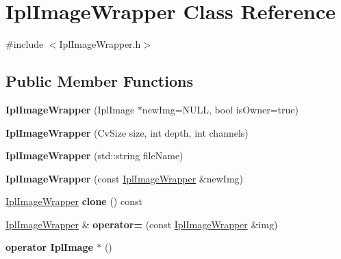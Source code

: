 \hypertarget{class_ipl_image_wrapper}{
\section{IplImageWrapper Class Reference}
\label{class_ipl_image_wrapper}
}


{\ttfamily \#include $<$IplImageWrapper.h$>$}

\subsection*{Public Member Functions}
\begin{DoxyCompactItemize}
\item 
\hypertarget{class_ipl_image_wrapper_a7516a4fcd5b663df2b8549b7b8f5c578}{
{\bfseries IplImageWrapper} (IplImage $\ast$newImg=NULL, bool isOwner=true)}
\label{class_ipl_image_wrapper_a7516a4fcd5b663df2b8549b7b8f5c578}

\item 
\hypertarget{class_ipl_image_wrapper_a2216b0bfc63dbe956a57fc4702ebf271}{
{\bfseries IplImageWrapper} (CvSize size, int depth, int channels)}
\label{class_ipl_image_wrapper_a2216b0bfc63dbe956a57fc4702ebf271}

\item 
\hypertarget{class_ipl_image_wrapper_a0eba79af9d74dd81877615d882ef1899}{
{\bfseries IplImageWrapper} (std::string fileName)}
\label{class_ipl_image_wrapper_a0eba79af9d74dd81877615d882ef1899}

\item 
\hypertarget{class_ipl_image_wrapper_a15058194f8584af51f2d3fb74ddf9797}{
{\bfseries IplImageWrapper} (const \hyperlink{class_ipl_image_wrapper}{IplImageWrapper} \&newImg)}
\label{class_ipl_image_wrapper_a15058194f8584af51f2d3fb74ddf9797}

\item 
\hypertarget{class_ipl_image_wrapper_aad2804ccc119c57efc5e445cdc40925f}{
\hyperlink{class_ipl_image_wrapper}{IplImageWrapper} {\bfseries clone} () const }
\label{class_ipl_image_wrapper_aad2804ccc119c57efc5e445cdc40925f}

\item 
\hypertarget{class_ipl_image_wrapper_a1bd6b4257f787448f6a03cf6619e8320}{
\hyperlink{class_ipl_image_wrapper}{IplImageWrapper} \& {\bfseries operator=} (const \hyperlink{class_ipl_image_wrapper}{IplImageWrapper} \&img)}
\label{class_ipl_image_wrapper_a1bd6b4257f787448f6a03cf6619e8320}

\item 
\hypertarget{class_ipl_image_wrapper_a6a4e72dcabb66c3577ce4c07ea1b7246}{
{\bfseries operator IplImage $\ast$} ()}
\label{class_ipl_image_wrapper_a6a4e72dcabb66c3577ce4c07ea1b7246}


\end{DoxyCompactItemize}
